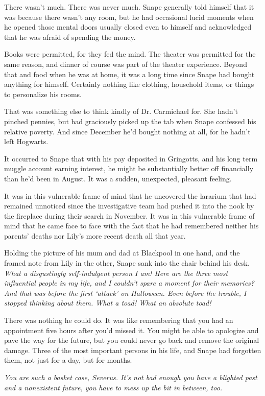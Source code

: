 \documentclass[a4paper,11pt]{article}
\begin{document}
There wasn't much. There was never much. Snape generally told himself that it was because there wasn't any room, but he had occasional lucid moments when he opened those mental doors usually closed even to himself and acknowledged that he was afraid of spending the money.

Books were permitted, for they fed the mind. The theater was permitted for the same reason, and dinner of course was part of the theater experience. Beyond that and food when he was at home, it was a long time since Snape had bought anything for himself. Certainly nothing like clothing, household items, or things to personalize his rooms.

That was something else to think kindly of Dr. Carmichael for. She hadn't pinched pennies, but had graciously picked up the tab when Snape confessed his relative poverty. And since December he'd bought nothing at all, for he hadn't left Hogwarts.

It occurred to Snape that with his pay deposited in Gringotts, and his long term muggle account earning interest, he might be substantially better off financially than he'd been in August. It was a sudden, unexpected, pleasant feeling.

It was in this vulnerable frame of mind that he uncovered the lararium that had remained unnoticed since the investigative team had pushed it into the nook by the fireplace during their search in November. It was in this vulnerable frame of mind that he came face to face with the fact that he had remembered neither his parents' deaths nor Lily's more recent death all that year.

Holding the picture of his mum and dad at Blackpool in one hand, and the framed note from Lily in the other, Snape sank into the chair behind his desk. \emph{What a disgustingly self-indulgent person I am! Here are the three most influential people in my life, and I couldn't spare a moment for their memories? And that was before the first `attack' on Halloween. Even before the trouble, I stopped thinking about them. What a toad! What an absolute toad!}

There was nothing he could do. It was like remembering that you had an appointment five hours after you'd missed it. You might be able to apologize and pave the way for the future, but you could never go back and remove the original damage. Three of the most important persons in his life, and Snape had forgotten them, not just for a day, but for months.

\emph{You are such a basket case, Severus. It's not bad enough you have a blighted past and a nonexistent future, you have to mess up the bit in between, too.}
\end{document}
